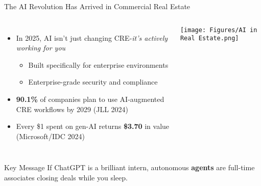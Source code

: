 \documentclass{beamer}
\begin{document}
\begin{frame}{The AI Revolution Has Arrived in Commercial Real Estate}
\small
  \begin{columns}[onlytextwidth]
  \hspace*{-.7cm}
      \begin{itemize}
        \item In 2025, AI isn’t just changing CRE-\emph{it’s actively working for you}
          \begin{itemize}
            \item Built specifically for enterprise environments
            \item Enterprise-grade security and compliance
          \end{itemize}
        \item \textbf{90.1\%} of companies plan to use AI-augmented CRE workflows by 2029 {\tiny(JLL 2024)} 
        \item Every \$1 spent on gen-AI returns \textbf{\$3.70} in value  {\tiny(Microsoft/IDC 2024)}
      \end{itemize}
    \hspace*{-1.3cm}
      \centering
      \texttt{[image: Figures/AI in Real Estate.png]}
  \end{columns}

  \vspace{-0.3cm}

  \begin{block}{Key Message}
    If ChatGPT is a brilliant intern, autonomous \textbf{agents} are full-time
    associates closing deals while you sleep.
  \end{block}
\end{frame}


\end{document}
